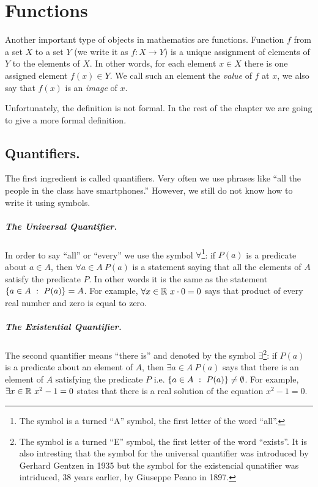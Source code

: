 \chapter{Functions}

Another important type of objects in mathematics are functions. Function $f$
from a set $X$ to a set $Y$ (we write it as $f : X \to Y$) is a unique
assignment of elements of $Y$ to the elements of $X$. In other words, for each
element $x \in X$ there is one assigned element $f(x) \in Y$. We call such an
element the \emph{value} of $f$ at $x$, we also say that $f(x)$ is an
\emph{image} of $x$.

Unfortunately, the definition is not formal. In the rest of the chapter we are
going to give a more formal definition.

\section{Quantifiers.}
The first ingredient is called quantifiers. Very often we use phrases like ``all
the people in the class have smartphones.'' However, we still do not know how to
write it using symbols.

\paragraph{The Universal Quantifier.}
In order to say ``all'' or ``every'' we use the symbol $\forall$\footnote{%
  The symbol is a turned ``A'' symbol, the first letter of the word ``all''.
}: if $P(a)$ is a predicate about $a \in A$, then $\forall a \in A\ P(a)$ is a
statement saying that all the elements of $A$ satisfy the predicate $P$. In
other words it is the same as the statement
$\set[P(a)]{a \in A} = A$. For example, $\forall x \in \mathbb{R}\ x \cdot 0 = 0$ says
that product of every real number and zero is equal to zero.

\paragraph{The Existential Quantifier.}
The second quantifier means ``there is'' and denoted by the symbol
$\exists$\footnote{%
  The symbol is a turned ``E'' symbol, the first letter of the word ``exists''.
  It is also intresting that the symbol for the universal quantifier was
  introduced by Gerhard Gentzen in 1935 but the symbol for the existencial
  qunatifier was intriduced, 38 years earlier, by Giuseppe Peano in 1897.
}:
if $P(a)$ is a predicate about an element of $A$, then $\exists a \in A\ P(a)$
says that there is an element of $A$ satisfying the predicate $P$ i.e.
$\set[P(a)]{a \in A} \neq \emptyset$. For example,
$\exists x \in \mathbb{R}\ x^2 - 1 = 0$ states that there is a real solution of the
equation $x^2 - 1 = 0$.

